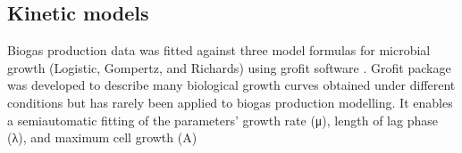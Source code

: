 \subsection{Kinetic models}
Biogas production data was fitted against three model formulas for microbial growth (Logistic, Gompertz, and Richards) using grofit software \cite{Kahm_2010}. Grofit package was developed to describe many biological growth curves obtained under different conditions but has rarely been applied to biogas production modelling.  It enables a semiautomatic fitting of the parameters’ growth rate (μ), length of lag phase (λ), and maximum cell growth (A) 